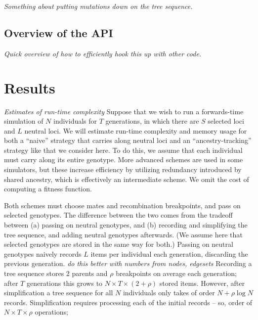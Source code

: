 \documentclass{article}
\newcommand{\plr}[1]{{\em \color{blue} #1}}
\begin{document}
\plr{Something about putting mutations down on the tree sequence.}

\subsection*{Overview of the API}

\plr{Quick overview of how to efficiently hook this up with other code.}


\section*{Results}

\plr{Estimates of run-time complexity}
Suppose that we wish to run a forwards-time simulation of $N$ individuals for $T$ generations,
in which there are $S$ selected loci and $L$ neutral loci.
We will estimate run-time complexity and memory usage for both a ``naive'' strategy that carries along neutral loci
and an ``ancestry-tracking'' strategy like that we consider here.
To do this, we assume that each individual must carry along its entire genotype.
More advanced schemes are used in some simulators,
but these increase efficiency by utilizing redundancy introduced by shared ancestry,
which is effectively an intermediate scheme.
We omit the cost of computing a fitness function.

Both schemes must choose mates and recombination breakpoints,
and pass on selected genotypes.
The difference between the two comes from the tradeoff between
(a) passing on neutral genotypes, and
(b) recording and simplifying the tree sequence, and adding neutral genotypes afterwards.
(We assume here that selected genotypes are stored in the same way for both.)
Passing on neutral genotypes naively records $L$ items per individual each generation, discarding the previous generation.
\plr{do this better with numbers from nodes, edgesets}
Recording a tree sequence stores 2 parents and $\rho$ breakpoints on average each generation;
after $T$ generations this grows to $N \times T \times (2 + \rho)$ stored items.
However, after simplification a tree sequence for all $N$ individuals
only takes of order $N + \rho \log N$ records.
Simplification requires processing each of the initial records -- so, order of $N \times T \times \rho$ operations;


\end{document}
